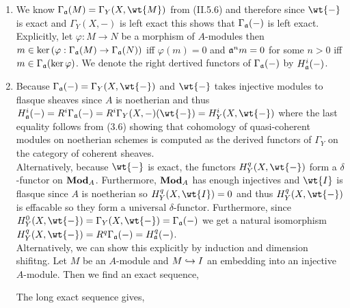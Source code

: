\documentclass[12pt]{article}
\begin{document}
\begin{enumerate}
\item We know $\Gamma_\a(M) = \Gamma_Y(X, \wt{M})$ from (II.5.6) and therefore since $\wt{-}$ is exact and $\Gamma_Y(X, -)$ is left exact this shows that $\Gamma_{\mathfrak{a}}(-)$ is left exact. Explicitly, let $\varphi : M \to N$ be a morphism of $A$-modules then $m \in \ker{(\varphi : \Gamma_{\mathfrak{a}}(M) \to \Gamma_{\mathfrak{a}}(N))}$ iff $\varphi(m) = 0$ and $\mathfrak{a}^n m = 0$ for some $n > 0$ iff $m \in \Gamma_{\mathfrak{a}}(\ker{\varphi})$. We denote the right dertived functors of $\Gamma_{\mathfrak{a}}(-)$ by $H_{\mathfrak{a}}^i(-)$.

\item Because $\Gamma_\a(-) = \Gamma_Y(X, \wt{-})$ and $\wt{-}$ takes injective modules to flasque sheaves since $A$ is noetherian and thus $H_\a^i(-) = R^i \Gamma_\a(-) = R^i \Gamma_Y(X, -)(\wt{-}) = H_Y^i(X, \wt{-})$ where the last equality follows from (3.6) showing that cohomology of quasi-coherent modules on noetherian schemes is computed as the derived functors of $\Gamma_Y$ on the category of coherent sheaves. 
\bigskip\\
Alternatively, because $\wt{-}$ is exact, the functors $H^q_Y(X, \wt{-})$ form a $\delta$-functor on $\mathbf{Mod}_{A}$. Furthermore, $\mathbf{Mod}_{A}$ has enough injectives and $\wt{I}$ is flasque since $A$ is noetherian so $H^q_Y(X, \wt{I}) = 0$ and thus $H^q_Y(X, \wt{-})$ is effacable so they form a universal $\delta$-functor. Furthermore, since $H^0_Y(X, \wt{-}) = \Gamma_Y(X, \wt{-}) = \Gamma_\a(-)$ we get a natural isomorphism $H^q_Y(X, \wt{-}) = R^q \Gamma_\a(-) = H^q_\a(-)$.
\bigskip\\
Alternatively, we can show this explicitly by induction and dimension shifitng. Let $M$ be an $A$-module and $M \hookrightarrow I$ an embedding into an injective $A$-module. Then we find an exact sequence,
\begin{center}
\end{center}
The long exact sequence gives,
\begin{center}
\end{center}

\end{enumerate}
\end{document}
